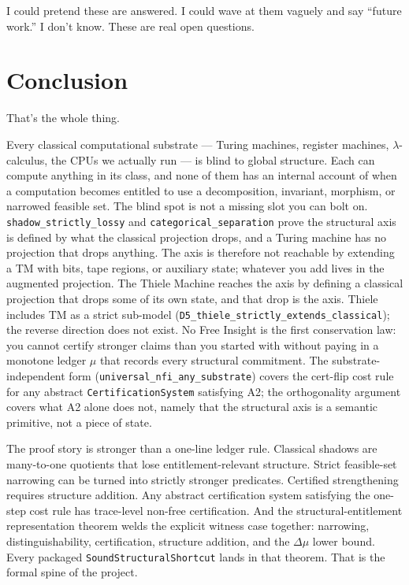 \documentclass[11pt,a4paper]{article}
\theoremstyle{plain}
\theoremstyle{definition}
\theoremstyle{remark}
\begin{document}
I could pretend these are answered. I could wave at them vaguely and say ``future work.'' I don't know. These are real open questions.

\section{Conclusion}

That's the whole thing.

Every classical computational substrate --- Turing machines, register machines, $\lambda$-calculus, the CPUs we actually run --- is blind to global structure. Each can compute anything in its class, and none of them has an internal account of when a computation becomes entitled to use a decomposition, invariant, morphism, or narrowed feasible set. The blind spot is not a missing slot you can bolt on. \texttt{shadow\_strictly\_lossy} and \texttt{categorical\_separation} prove the structural axis is defined by what the classical projection drops, and a Turing machine has no projection that drops anything. The axis is therefore not reachable by extending a TM with bits, tape regions, or auxiliary state; whatever you add lives in the augmented projection. The Thiele Machine reaches the axis by defining a classical projection that drops some of its own state, and that drop is the axis. Thiele includes TM as a strict sub-model (\texttt{D5\_thiele\_strictly\_extends\_classical}); the reverse direction does not exist. No Free Insight is the first conservation law: you cannot certify stronger claims than you started with without paying in a monotone ledger $\mu$ that records every structural commitment. The substrate-independent form (\texttt{universal\_nfi\_any\_substrate}) covers the cert-flip cost rule for any abstract \texttt{CertificationSystem} satisfying A2; the orthogonality argument covers what A2 alone does not, namely that the structural axis is a semantic primitive, not a piece of state.

The proof story is stronger than a one-line ledger rule. Classical shadows are many-to-one quotients that lose entitlement-relevant structure. Strict feasible-set narrowing can be turned into strictly stronger predicates. Certified strengthening requires structure addition. Any abstract certification system satisfying the one-step cost rule has trace-level non-free certification. And the structural-entitlement representation theorem welds the explicit witness case together: narrowing, distinguishability, certification, structure addition, and the $\Delta\mu$ lower bound. Every packaged \texttt{SoundStructuralShortcut} lands in that theorem. That is the formal spine of the project.
\end{document}
